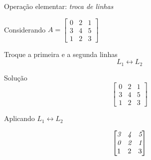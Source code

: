 \begin{question}
Operação elementar: \emph{troca de linhas}

Considerando
\(
  A =
  \begin{bmatrix}
    0 & 2 & 1 \\
    3 & 4 & 5 \\
    1 & 2 & 3
  \end{bmatrix}
\)

Troque a primeira e a segunda linhas
\[
  L_1\leftrightarrow L_2
\]
\end{question}

\begin{resolution}{Solução}
\[
\begin{bmatrix}
  0 & 2 & 1 \\
  3 & 4 & 5 \\
  1 & 2 & 3
\end{bmatrix}
\]

\pause
Aplicando
\(
  L_1\leftrightarrow L_2
\)

\pause
\[
\begin{bmatrix}
  \emph{3} & \emph{4} & \emph{5} \\
  \emph{0} & \emph{2} & \emph{1} \\
  1 & 2 & 3
\end{bmatrix}
\]
\end{resolution}

